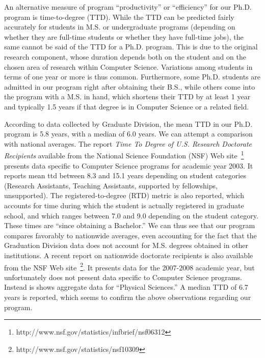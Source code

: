 \documentclass[12pt]{article}
\begin{document}
An alternative measure of program ``productivity'' or ``efficiency'' for
our Ph.D. program is time-to-degree (TTD).  While the TTD can be predicted
fairly accurately for students in M.S. or undergraduate programs (depending
on whether they are full-time students or whether they have full-time
jobs), the same cannot be said of the TTD for a Ph.D. program. This is due
to the original research component, whose duration depends both on the
student and on the chosen area of research within Computer
Science. Variations among students in terms of one year or more is thus
common. Furthermore, some Ph.D.  students are admitted in our program right
after obtaining their B.S., while others come into the program with a
M.S. in hand, which shortens their TTD by at least 1 year and typically 1.5
years if that degree is in Computer Science or a related field.

According to data collected by Graduate Division, the mean TTD in our
Ph.D. program is 5.8 years, with a median of 6.0 years. We can attempt
a comparison with national averages. The report \emph{Time
To Degree of U.S. Research Doctorate Recipients} available from the
National Science Foundation (NSF) Web
site~\footnote{http://www.nsf.gov/statistics/infbrief/nsf06312}
presents data specific to Computer Science programs for academic year
2003. It reports mean ttd between 8.3 and 15.1 years depending on
student categories (Research Assistants, Teaching Assistants,
supported by fellowships, unsupported). The registered-to-degree (RTD)
metric is also reported, which accounts for time during which the
student is actually registered in graduate school, and which ranges
between 7.0 and 9.0 depending on the student category. These times are
``since obtaining a Bachelor.'' We can thus see that our program
compares favorably to nationwide averages, even accounting for the
fact that the Graduation Division data does not account for M.S.
degrees obtained in other institutions.  A recent report on nationwide
doctorate recipients is also available from the NSF Web
site~\footnote{http://www.nsf.gov/statistics/nsf10309}. It presents
data for the 2007-2008 academic year, but unfortunately does not
present data specific to Computer Science programs. Instead is shows
aggregate data for ``Physical Sciences.'' A median TTD of 6.7 years is
reported, which seems to confirm the above observations regarding our program.
\end{document}
